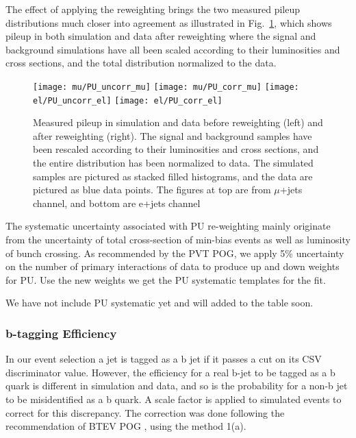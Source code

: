 The effect of applying the reweighting brings the two measured pileup distributions much closer into agreement as illustrated in Fig.~\ref{fig:pileup_comparison}, which shows pileup in both simulation and data after reweighting where the signal and background simulations have all been scaled according to their luminosities and cross sections, and the total distribution normalized to the data.

\begin{figure}[hbt]
  \begin{center}
    \texttt{[image: mu/PU\_uncorr\_mu]}
    \texttt{[image: mu/PU\_corr\_mu]}
    \texttt{[image: el/PU\_uncorr\_el]}
    \texttt{[image: el/PU\_corr\_el]}
  \caption{\small Measured pileup in simulation and data before reweighting (left) and after reweighting (right). The signal and background samples have been rescaled according to their luminosities and cross sections, and the entire distribution has been normalized to data. The simulated samples are pictured as stacked filled histograms, and the data are pictured as blue data points. The figures at top are from $\mu$+jets channel, and bottom are e+jets channel}
    \label{fig:pileup_comparison}
  \end{center}
\end{figure}

The systematic uncertainty associated with PU re-weighting mainly originate from the uncertainty of total cross-section of min-bias events as well as luminosity of bunch crossing. As recommended by the PVT POG, we apply 5\% uncertainty on the number of primary interactions of data to produce up and down weights for PU. Use the new weights we get the PU systematic templates for the fit. 

We have not include PU systematic yet and will added to the table soon.

\subsubsection{b-tagging Efficiency}
In our event selection a jet is tagged as a b jet if it passes a cut on its CSV discriminator value. However, the efficiency for a real b-jet to be tagged as a b quark is different in simulation and data, and so is the probability for a non-b jet to be misidentified as a b quark. A scale factor is applied to simulated events to correct for this discrepancy. The correction was done following the recommendation of BTEV POG \cite{Btag_POG}, using the method 1(a).

